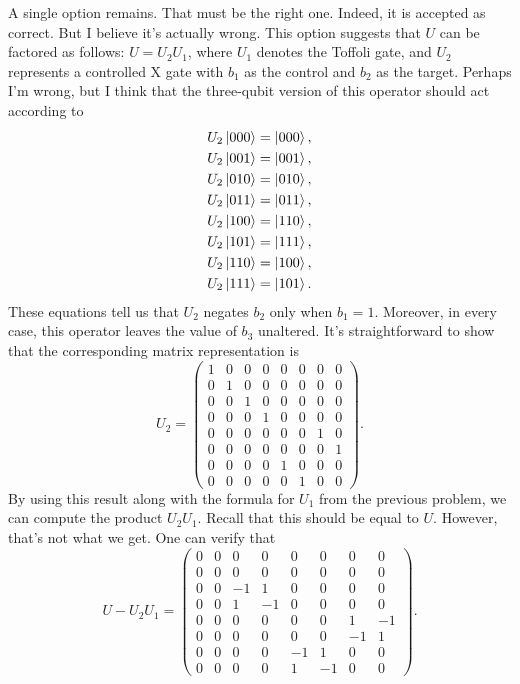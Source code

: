 \documentclass[10pt]{article}
\begin{document}
A single option remains. That must be the right one. Indeed, it is accepted as
correct. But I believe it's actually wrong. This option suggests that \(U\)
can be factored as follows: \(U=U_2U_1\), where \(U_1\) denotes the Toffoli
gate, and \(U_2\) represents a controlled X gate with \(b_1\) as the control
and \(b_2\) as the target. Perhaps I'm wrong, but I think that the three-qubit
version of this operator should act according to
\begin{align}
  \begin{split}
    U_2\ket{000}&=\ket{000},\\
    U_2\ket{001}&=\ket{001},\\
    U_2\ket{010}&=\ket{010},\\
    U_2\ket{011}&=\ket{011},\\
    U_2\ket{100}&=\ket{110},\\
    U_2\ket{101}&=\ket{111},\\
    U_2\ket{110}&=\ket{100},\\
    U_2\ket{111}&=\ket{101}.
  \end{split}
\end{align}
These equations tell us that \(U_2\) negates \(b_2\) only when \(b_1=1\).
Moreover, in every case, this operator leaves the value of \(b_3\) unaltered.
It's straightforward to show that the corresponding matrix representation is
\begin{equation}
U_2=
  \begin{pmatrix}
    1 & 0 & 0 & 0 & 0 & 0 & 0 & 0\\
    0 & 1 & 0 & 0 & 0 & 0 & 0 & 0\\
    0 & 0 & 1 & 0 & 0 & 0 & 0 & 0\\
    0 & 0 & 0 & 1 & 0 & 0 & 0 & 0\\
    0 & 0 & 0 & 0 & 0 & 0 & 1 & 0\\
    0 & 0 & 0 & 0 & 0 & 0 & 0 & 1\\
    0 & 0 & 0 & 0 & 1 & 0 & 0 & 0\\
    0 & 0 & 0 & 0 & 0 & 1 & 0 & 0
  \end{pmatrix}.
\end{equation}
By using this result along with the formula for \(U_1\) from the previous
problem, we can compute the product \(U_2U_1\). Recall that this should be
equal to \(U\). However, that's not what we get. One can verify that
\begin{equation}
U-U_2U_1=
  \begin{pmatrix}
    0 & 0 & 0 & 0 & 0 & 0 & 0 & 0\\
    0 & 0 & 0 & 0 & 0 & 0 & 0 & 0\\
    0 & 0 & -1 & 1 & 0 & 0 & 0 & 0\\
    0 & 0 & 1 & -1 & 0 & 0 & 0 & 0\\
    0 & 0 & 0 & 0 & 0 & 0 & 1 & -1\\
    0 & 0 & 0 & 0 & 0 & 0 & -1 & 1\\
    0 & 0 & 0 & 0 & -1 & 1 & 0 & 0\\
    0 & 0 & 0 & 0 & 1 & -1 & 0 & 0
  \end{pmatrix}.
\end{equation}
\end{document}
